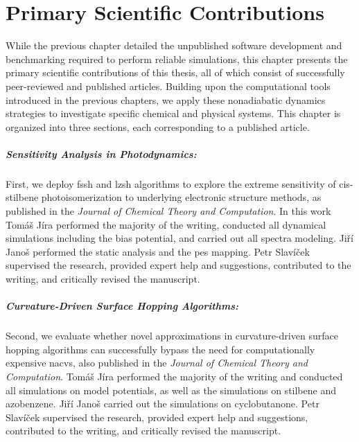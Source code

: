 \chapter{Primary Scientific Contributions}\label{chp:primary_scientific_contributions}
While the previous chapter detailed the unpublished software development and benchmarking required to perform reliable simulations, this chapter presents the primary scientific contributions of this thesis, all of which consist of successfully peer-reviewed and published articles. Building upon the computational tools introduced in the previous chapters, we apply these nonadiabatic dynamics strategies to investigate specific chemical and physical systems. This chapter is organized into three sections, each corresponding to a published article.
\paragraph{Sensitivity Analysis in Photodynamics:} First, we deploy \gls{fssh} and \gls{lzsh} algorithms to explore the extreme sensitivity of cis-stilbene photoisomerization to underlying electronic structure methods, as published in the \textit{Journal of Chemical Theory and Computation}. In this work Tomáš Jíra performed the majority of the writing, conducted all dynamical simulations including the bias potential, and carried out all spectra modeling. Jiří Janoš performed the static analysis and the \gls{pes} mapping. Petr Slavíček supervised the research, provided expert help and suggestions, contributed to the writing, and critically revised the manuscript.
\paragraph{Curvature-Driven Surface Hopping Algorithms:} Second, we evaluate whether novel approximations in curvature-driven surface hopping algorithms can successfully bypass the need for computationally expensive \glspl{nacv}, also published in the \textit{Journal of Chemical Theory and Computation}. Tomáš Jíra performed the majority of the writing and conducted all simulations on model potentials, as well as the simulations on stilbene and azobenzene. Jiří Janoš carried out the simulations on cyclobutanone. Petr Slavíček supervised the research, provided expert help and suggestions, contributed to the writing, and critically revised the manuscript.
